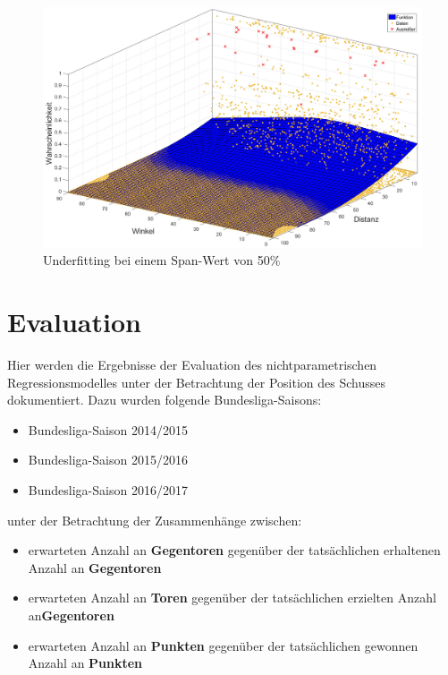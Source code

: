\begin{figure}[H]
\centering
\includegraphics[scale=0.34]{se-wa-jpg/splinewdTL}
\caption{Underfitting bei einem Span-Wert von 50\%}
\label{splinewdTL}
\end{figure}

\chapter{Evaluation}
\label{anheva}

Hier werden die Ergebnisse der Evaluation des nichtparametrischen Regressionsmodelles unter der Betrachtung der Position des Schusses dokumentiert. Dazu wurden folgende Bundesliga-Saisons:

\begin{itemize}
\item Bundesliga-Saison 2014/2015 
\item Bundesliga-Saison 2015/2016 
\item Bundesliga-Saison 2016/2017 
\end{itemize}

unter der Betrachtung der Zusammenhänge zwischen:

\begin{itemize}
\item erwarteten Anzahl an \textbf{Gegentoren} gegenüber der tatsächlichen erhaltenen Anzahl an \textbf{Gegentoren}
\item erwarteten Anzahl an \textbf{Toren} gegenüber der tatsächlichen erzielten Anzahl an\textbf{Gegentoren}
\item erwarteten Anzahl an \textbf{Punkten} gegenüber der tatsächlichen gewonnen Anzahl an \textbf{Punkten}
\end{itemize}

